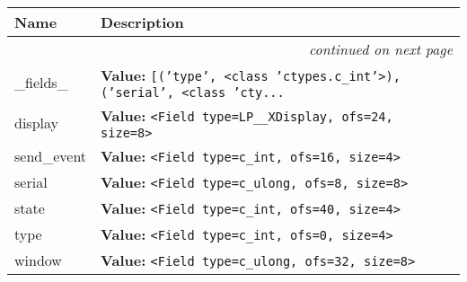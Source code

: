     \vspace{-1cm}
\hspace{\varindent}\begin{longtable}{|p{\varnamewidth}|p{\vardescrwidth}|l}
\cline{1-2}
\cline{1-2} \centering \textbf{Name} & \centering \textbf{Description}& \\
\cline{1-2}
\endhead\cline{1-2}\multicolumn{3}{r}{\small\textit{continued on next page}}\\\endfoot\cline{1-2}
\endlastfoot\raggedright \_\-f\-i\-e\-l\-d\-s\-\_\- & \raggedright \textbf{Value:} 
{\tt \texttt{[}\texttt{(}\texttt{'}\texttt{type}\texttt{'}\texttt{, }{\textless}class 'ctypes.c\_int'{\textgreater}\texttt{)}\texttt{, }\texttt{(}\texttt{'}\texttt{serial}\texttt{'}\texttt{, }{\textless}class 'cty\texttt{...}}&\\
\cline{1-2}
\raggedright d\-i\-s\-p\-l\-a\-y\- & \raggedright \textbf{Value:} 
{\tt {\textless}Field type=LP\_\_XDisplay, ofs=24, size=8{\textgreater}}&\\
\cline{1-2}
\raggedright s\-e\-n\-d\-\_\-e\-v\-e\-n\-t\- & \raggedright \textbf{Value:} 
{\tt {\textless}Field type=c\_int, ofs=16, size=4{\textgreater}}&\\
\cline{1-2}
\raggedright s\-e\-r\-i\-a\-l\- & \raggedright \textbf{Value:} 
{\tt {\textless}Field type=c\_ulong, ofs=8, size=8{\textgreater}}&\\
\cline{1-2}
\raggedright s\-t\-a\-t\-e\- & \raggedright \textbf{Value:} 
{\tt {\textless}Field type=c\_int, ofs=40, size=4{\textgreater}}&\\
\cline{1-2}
\raggedright t\-y\-p\-e\- & \raggedright \textbf{Value:} 
{\tt {\textless}Field type=c\_int, ofs=0, size=4{\textgreater}}&\\
\cline{1-2}
\raggedright w\-i\-n\-d\-o\-w\- & \raggedright \textbf{Value:} 
{\tt {\textless}Field type=c\_ulong, ofs=32, size=8{\textgreater}}&\\
\cline{1-2}
\end{longtable}




